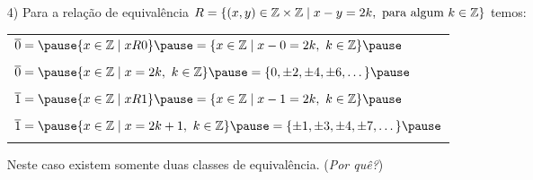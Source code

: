 \documentclass{beamer}
\begin{document}
    \begin{frame}
        \begin{exemplos}
            \begin{enumerate}
                \item[4)] Para a rela\c{c}\~ao de equival\^encia $R = \{(x,y)\in \mathbb{Z} \times \mathbb{Z} \mid x - y = 2k, \mbox{ para algum } k \in \mathbb{Z}\}$ temos:
                \begin{center}
                    \begin{tabular}{l}
                        $\overline{0} = \pause \{x \in \z \mid xR0 \} \pause = \{x \in \z \mid x - 0 = 2k,\ k \in \z\} \pause$\\ \\
                        $\overline{0} = \pause \{x \in \z \mid x = 2k,\ k \in \z\} \pause = \{0, \pm 2, \pm 4, \pm 6, \dots\} \pause$\\ \\
                        $\overline{1} = \pause \{x \in \z \mid xR1 \} \pause = \{x \in \z \mid x - 1 = 2k,\ k \in \z\} \pause$\\ \\
                        $\overline{1} = \pause \{x \in \z \mid x = 2k + 1,\ k \in \z\} \pause = \{\pm 1, \pm 3, \pm 4, \pm 7, \dots\} \pause$\\ \\
                    \end{tabular}
                \end{center}
                Neste caso existem somente duas classes de equival\^encia. (\textit{Por qu\^e?})
            \end{enumerate}
        \end{exemplos}
    \end{frame}
\end{document}
